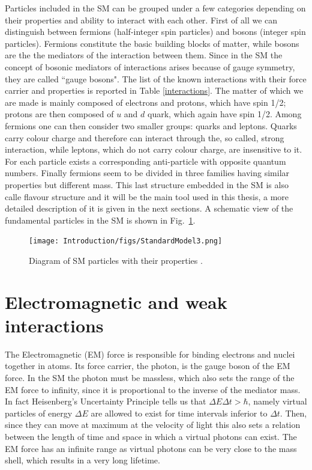 Particles included in the SM can be grouped under a few categories depending on their properties and ability to interact with
each other. First of all we can distinguish between fermions (half-integer spin particles) and bosons (integer spin particles).
Fermions constitute the basic building blocks of matter, while bosons are the the mediators of the interaction between them.
Since in the SM the concept of bosonic mediators of interactions arises because of gauge symmetry\cite{Glashow:1961tr},
they are called ``gauge bosons". The list of the known interactions with their force carrier and properties is reported
in Table \ref{interactions}. The matter of which we are made is mainly composed of electrons and protons, which have spin 1/2;
protons are then composed of $u$ and $d$ quark, which again have spin 1/2. Among fermions one can then consider two smaller
groups: quarks and leptons. Quarks carry colour charge and therefore can interact through the, so called, strong interaction,
while leptons, which do not carry colour charge, are insensitive to it.
For each particle exists a corresponding anti-particle with opposite quantum numbers.
Finally fermions seem to be divided in three families having similar properties but different mass.
This last structure embedded in the SM is also calle flavour structure and it will be the main tool
used in this thesis, a more detailed description of it is given in the next sections.
A schematic view of the fundamental particles in the SM is shown in Fig.~\ref{fig:SMparticles}.

\begin{figure}[h]
\centering
\texttt{[image: Introduction/figs/StandardModel3.png]}
\caption{Diagram of SM particles with their properties \cite{SMimage}.}
\label{fig:SMparticles}
\end{figure}






\section{Electromagnetic and weak interactions}

The Electromagnetic (EM) force is responsible for binding electrons and nuclei together in atoms.
Its force carrier, the photon, is the gauge boson of the EM force. In the SM the photon must be massless,
which also sets the range of the EM force to infinity, since it is proportional to the inverse of the mediator mass.
In fact Heisenberg's Uncertainty Principle tells us that $\Delta E \Delta t > \hbar$, namely virtual particles
of energy $\Delta E$ are allowed to exist for time intervals inferior to $\Delta t$. Then, since they can move
at maximum at the velocity of light this also sets a relation between the length of time and space in which a virtual
photons can exist. The EM force has an infinite range as virtual photons can be very close to the mass shell, which results
in a very long lifetime.

